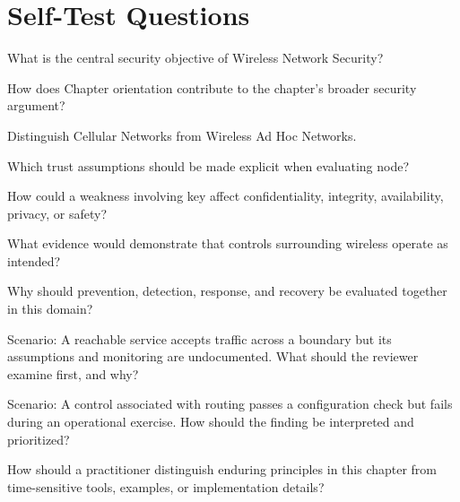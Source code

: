 \documentclass[11pt,letterpaper]{article}
\begin{document}
\section*{Self-Test Questions}
\begin{CornellRecallList}
\item What is the central security objective of Wireless Network Security?
\item How does Chapter orientation contribute to the chapter's broader security argument?
\item Distinguish Cellular Networks from Wireless Ad Hoc Networks.
\item Which trust assumptions should be made explicit when evaluating node?
\item How could a weakness involving key affect confidentiality, integrity, availability, privacy, or safety?
\item What evidence would demonstrate that controls surrounding wireless operate as intended?
\item Why should prevention, detection, response, and recovery be evaluated together in this domain?
\item Scenario: A reachable service accepts traffic across a boundary but its assumptions and monitoring are undocumented. What should the reviewer examine first, and why?
\item Scenario: A control associated with routing passes a configuration check but fails during an operational exercise. How should the finding be interpreted and prioritized?
\item How should a practitioner distinguish enduring principles in this chapter from time-sensitive tools, examples, or implementation details?
\end{CornellRecallList}
\end{document}
